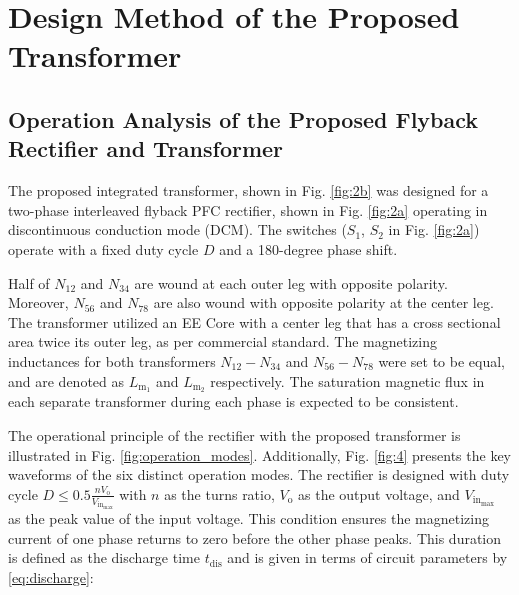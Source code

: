 \documentclass[lettersize,journal]{IEEEtran}
\begin{document}
\section{Design Method of the Proposed Transformer}

\subsection{Operation Analysis of the Proposed Flyback Rectifier and Transformer}
The proposed integrated transformer, shown in Fig. \ref{fig:2b} was designed for a two-phase interleaved flyback PFC rectifier, shown in Fig. \ref{fig:2a} operating in discontinuous conduction mode (DCM). The switches ($S_1$, $S_2$ in Fig. \ref{fig:2a}) operate with a fixed duty cycle $D$ and a 180-degree phase shift.

Half of $N_{12}$ and $N_{34}$ are wound at each outer leg with opposite polarity. Moreover, $N_{56}$ and $N_{78}$ are also wound with opposite polarity at the center leg. The transformer utilized an EE Core with a center leg that has a cross sectional area twice its outer leg, as per commercial standard. The magnetizing inductances for both transformers $N_{12}-N_{34}$ and $N_{56}-N_{78}$ were set to be equal, and are denoted as $L_{\mathrm{m}_1}$ and $L_{\mathrm{m}_2}$ respectively. The saturation magnetic flux in each separate transformer during each phase is expected to be consistent.

The operational principle of the rectifier with the proposed transformer is illustrated in Fig. \ref{fig:operation_modes}. Additionally, Fig. \ref{fig:4} presents the key waveforms of the six distinct operation modes. The rectifier is designed with duty cycle $D \le 0.5 \frac{n V_{\mathrm{o}}}{V_{\mathrm{in}_{\mathrm{max}}}}$ with $n$ as the turns ratio, $V_{\mathrm{o}}$ as the output voltage, and $V_{\mathrm{in}_{\mathrm{max}}}$ as the peak value of the input voltage. This condition ensures the magnetizing current of one phase returns to zero before the other phase peaks. This duration is defined as the discharge time $t_{\mathrm{dis}}$ and is given in terms of circuit parameters by \eqref{eq:discharge}:
\end{document}
